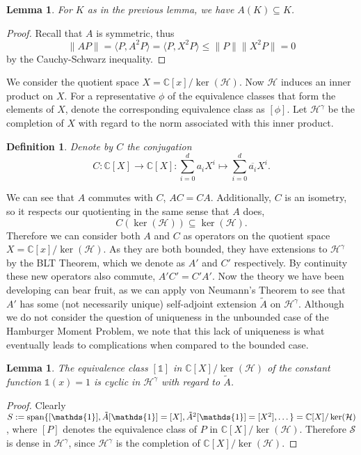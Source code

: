 \documentclass[12pt,oneside]{report}
\newtheorem{lem}[thm]{Lemma}
\newtheorem{defn}[thm]{Definition}
\begin{document}
\begin{lem}
    For $K$ as in the previous lemma, we have $A(K) \subseteq K$.
\end{lem}
\begin{proof}
    Recall that $A$ is symmetric, thus
    $$\|AP\| = \langle P, A^{2}P \rangle = \langle P, X^{2}P \rangle \leq \|P\|\|X^{2}P\| = 0$$
    by the Cauchy-Schwarz inequality.
\end{proof}

We consider the quotient space $X = \mathbb{C}[x]/\ker(\mathcal{H})$. Now $\mathcal{H}$ induces an inner product on $X$. For a representative $\phi$ of the equivalence classes that form the elements of $X$, denote the corresponding equivalence class as $[\phi]$. Let $\mathscr{H}^{\gamma}$ be the completion of $X$ with regard to the norm associated with this inner product.

\begin{defn}
    Denote by $C$ the conjugation $$C: \mathbb{C}[X] \to \mathbb{C}[X]: \sum_{i=0}^{d}a_{i}X^{i} \mapsto \sum_{i=0}^{d}\overline{a_{i}}X^{i}.$$
\end{defn}

We can see that $A$ commutes with $C$, $AC = CA$. Additionally, $C$ is an isometry, so it respects our quotienting in the same sense that $A$ does,
$$C(\ker(\mathcal{H})) \subseteq \ker(\mathcal{H}).$$
Therefore we can consider both $A$ and $C$ as operators on the quotient space $X = \mathbb{C}[x]/\ker(\mathcal{H})$. As they are both bounded, they have extensions to $\mathscr{H}^\gamma$ by the BLT Theorem, which we denote as $A'$ and $C'$ respectively. By continuity these new operators also commute, $A'C' = C'A'$. Now the theory we have been developing can bear fruit, as we can apply von Neumann's Theorem to see that $A'$ has some (not necessarily unique) self-adjoint extension $\tilde{A}$ on $\mathscr{H}^\gamma$. Although we do not consider the question of uniqueness in the unbounded case of the Hamburger Moment Problem, we note that this lack of uniqueness is what eventually leads to complications when compared to the bounded case.

\begin{lem}
    The equivalence class $[\mathds{1}]$ in $\mathbb{C}[X]/\ker(\mathcal{H})$ of the constant function $\mathds{1}(x) = 1$ is cyclic in $\mathscr{H}^{\gamma}$ with regard to $\tilde{A}$.
\end{lem}
\begin{proof}
    Clearly $S := \spanrm\{ [\mathds{1}], \tilde{A}[\mathds{1}] = [X], \tilde{A}^{2}[\mathds{1}] = [X^{2}], \dots \} = \mathbb{C}[X]/\ker(\mathcal{H})$, where $[P]$ denotes the equivalence class of $P$ in $\mathbb{C}[X]/\ker(\mathcal{H})$. Therefore $\mathcal{S}$ is dense in $\mathscr{H}^{\gamma}$, since $\mathscr{H}^{\gamma}$ is the completion of $\mathbb{C}[X]/\ker(\mathcal{H})$.
\end{proof}
\end{document}
